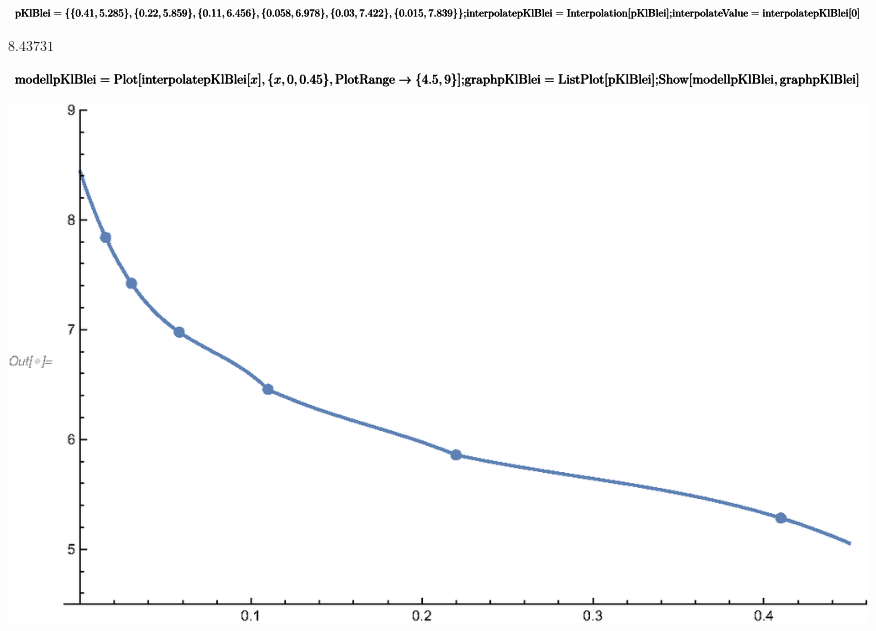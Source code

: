 \documentclass{article}
\begin{document}
\begin{doublespace}
\noindent\(\pmb{\text{pKlBlei}= \{\{0.41,5.285\},\{0.22,5.859\},\{0.11,6.456\},\{0.058,6.978\},\{0.03,7.422\},\{0.015,7.839\}\};}\\
\pmb{\text{interpolatepKlBlei} = \text{Interpolation}[\text{pKlBlei}];}\\
\pmb{\text{interpolateValue} = \text{interpolatepKlBlei}[0]}\)
\end{doublespace}

\begin{doublespace}
\noindent\(8.43731\)
\end{doublespace}

\begin{doublespace}
\noindent\(\pmb{\text{modellpKlBlei} = \text{Plot}[\text{interpolatepKlBlei}[x],\{x,0,0.45\},\text{PlotRange}\to \{4.5,9\}];}\\
\pmb{\text{graphpKlBlei} = \text{ListPlot}[\text{pKlBlei}];}\\
\pmb{\text{Show}[\text{modellpKlBlei},\text{graphpKlBlei}]}\)
\end{doublespace}

\includegraphics{Auswertung1_gr1.eps}
\end{document}
